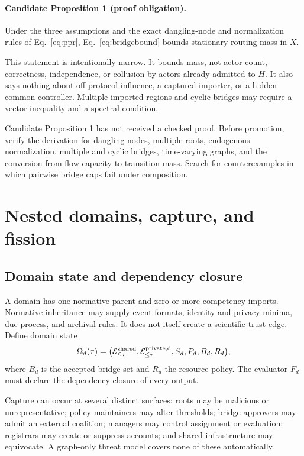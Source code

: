\documentclass[11pt]{article}
\newcommand{\events}{\mathcal{E}}
\begin{document}
\paragraph{Candidate Proposition 1 (proof obligation).}
Under the three assumptions and the exact dangling-node and normalization rules of Eq.~\eqref{eq:ppr}, Eq.~\eqref{eq:bridgebound} bounds stationary routing mass in $X$.

This statement is intentionally narrow.  It bounds mass, not actor count, correctness, independence, or collusion by actors already admitted to $H$.  It also says nothing about off-protocol influence, a captured importer, or a hidden common controller.  Multiple imported regions and cyclic bridges may require a vector inequality and a spectral condition.

\begin{evidencegate}
Candidate Proposition 1 has not received a checked proof.  Before promotion, verify the derivation for dangling nodes, multiple roots, endogenous normalization, multiple and cyclic bridges, time-varying graphs, and the conversion from flow capacity to transition mass.  Search for counterexamples in which pairwise bridge caps fail under composition.
\end{evidencegate}

\section{Nested domains, capture, and fission}

\subsection{Domain state and dependency closure}

A domain has one normative parent and zero or more competency imports.  Normative inheritance may supply event formats, identity and privacy minima, due process, and archival rules.  It does not itself create a scientific-trust edge.  Define domain state
\begin{equation}
 \Omega_d(\tau)=\bigl(\events^{\rm shared}_{\leq\tau},
 \events^{\rm private,d}_{\leq\tau},S_d,P_d,B_d,R_d\bigr),
 \label{eq:domainstate}
\end{equation}
where $B_d$ is the accepted bridge set and $R_d$ the resource policy.  The evaluator $F_d$ must declare the dependency closure of every output.

Capture can occur at several distinct surfaces: roots may be malicious or unrepresentative; policy maintainers may alter thresholds; bridge approvers may admit an external coalition; managers may control assignment or evaluation; registrars may create or suppress accounts; and shared infrastructure may equivocate.  A graph-only threat model covers none of these automatically.
\end{document}
